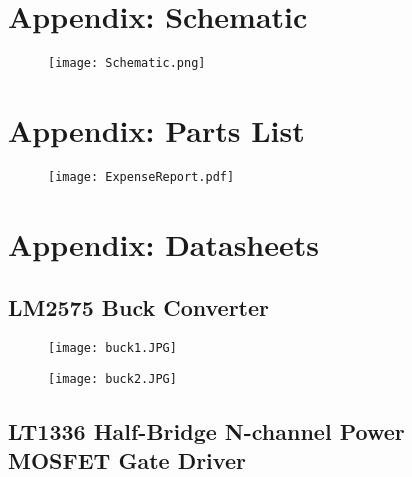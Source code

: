 \documentclass[11pt,letter]{article}
\begin{document}
\section{Appendix: Schematic}
\begin{figure}[H]
    \centering
    \texttt{[image: Schematic.png]}
\end{figure}

\section{Appendix: Parts List}

\begin{figure}[H]
    \centering
    \texttt{[image: ExpenseReport.pdf]}
\end{figure}

\newpage

\section{Appendix: Datasheets}

\subsection{LM2575 Buck Converter}

\begin{figure}[H]
    \centering
    \texttt{[image: buck1.JPG]}
\end{figure}

\begin{figure}[H]
    \centering
    \texttt{[image: buck2.JPG]}
\end{figure}

\newpage




\subsection{LT1336 Half-Bridge N-channel Power MOSFET Gate Driver}
\end{document}
